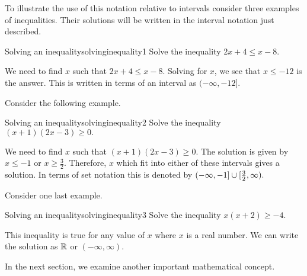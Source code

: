 To illustrate the use of this notation relative to intervals consider three
examples of inequalities. Their solutions will be written in the interval notation
just described.

\begin{example}{Solving an inequality}{solvinginequality1}
Solve the inequality $2x+4\leq x-8$.
\end{example}

\begin{solution}
We need to find $x$ such that $2x+4\leq x-8$. Solving for $x$, we see that 
$x\leq -12$ is the answer. This is written in terms of an interval as $(-\infty ,-12].$
\end{solution}

Consider the following example.

\begin{example}{Solving an inequality}{solvinginequality2}
Solve the inequality $\left( x+1\right) \left( 2x-3\right) \geq0.$
\end{example}

\begin{solution}
We need to find $x$ such that $\left( x+1\right) \left( 2x-3\right) \geq0.$ 
The solution is given by  $x\leq -1$ or $x\geq \frac{3}{2}$. Therefore, 
$x$ which fit into either of these intervals gives a solution. In terms of set notation this is denoted by $(-\infty ,-1]\cup
[ \vspace{0.05in}\frac{3}{2},\infty ).$
\end{solution}

Consider one last example.

\begin{example}{Solving an inequality}{solvinginequality3}
Solve the inequality $x \left( x+2\right) \geq-4$.
\end{example}

\begin{solution}
This inequality is true for any value of $x$ where $x$ is a real number. We can write the solution as $\mathbb{R}$ or $\left(
-\infty ,\infty \right) .$
\end{solution}

In the next section, we examine another important mathematical concept.

